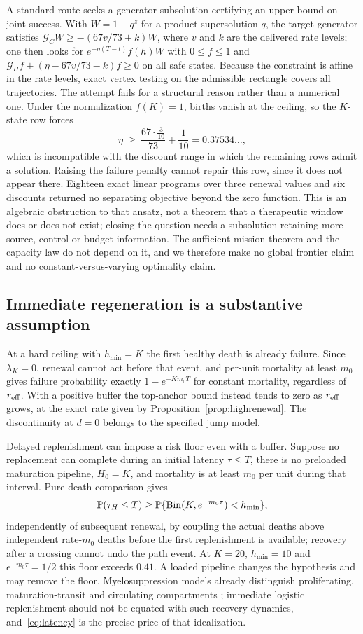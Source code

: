 A standard route seeks a generator subsolution certifying an upper bound on joint success. With $W=1-q^z$ for a product supersolution $q$, the target generator satisfies $\mathcal G_CW\ge-(67v/73+k)W$, where $v$ and $k$ are the delivered rate levels; one then looks for $e^{-\eta(T-t)}f(h)W$ with $0\le f\le1$ and $\mathcal G_Hf+(\eta-67v/73-k)f\ge0$ on all safe states. Because the constraint is affine in the rate levels, exact vertex testing on the admissible rectangle covers all trajectories. The attempt fails for a structural reason rather than a numerical one. Under the normalization $f(K)=1$, births vanish at the ceiling, so the $K$-state row forces
\[
 \eta\ \ge\ \frac{67\cdot\tfrac3{10}}{73}+\frac1{10}=0.37534\ldots,
\]
which is incompatible with the discount range in which the remaining rows admit a solution. Raising the failure penalty cannot repair this row, since it does not appear there. Eighteen exact linear programs over three renewal values and six discounts returned no separating objective beyond the zero function. This is an algebraic obstruction to that ansatz, not a theorem that a therapeutic window does or does not exist; closing the question needs a subsolution retaining more source, control or budget information. The sufficient mission theorem and the capacity law do not depend on it, and we therefore make no global frontier claim and no constant-versus-varying optimality claim.

\subsection{Immediate regeneration is a substantive assumption}
At a hard ceiling with $h_{\min}=K$ the first healthy death is already failure. Since $\lambda_K=0$, renewal cannot act before that event, and per-unit mortality at least $m_0$ gives failure probability exactly $1-e^{-Km_0T}$ for constant mortality, regardless of $r_{\mathrm{eff}}$. With a positive buffer the top-anchor bound instead tends to zero as $r_{\mathrm{eff}}$ grows, at the exact rate given by Proposition~\ref{prop:highrenewal}. The discontinuity at $d=0$ belongs to the specified jump model.

Delayed replenishment can impose a risk floor even with a buffer. Suppose no replacement can complete during an initial latency $\tau\le T$, there is no preloaded maturation pipeline, $H_0=K$, and mortality is at least $m_0$ per unit during that interval. Pure-death comparison gives
\begin{equation}\label{eq:latency}
 \mathbb P(\tau_H\le T)
 \ge\mathbb P\{\operatorname{Bin}(K,e^{-m_0\tau})<h_{\min}\},
\end{equation}
independently of subsequent renewal, by coupling the actual deaths above independent rate-$m_0$ deaths before the first replenishment is available; recovery after a crossing cannot undo the path event. At $K=20$, $h_{\min}=10$ and $e^{-m_0\tau}=1/2$ this floor exceeds $0.41$. A loaded pipeline changes the hypothesis and may remove the floor. Myelosuppression models already distinguish proliferating, maturation-transit and circulating compartments \citep{friberg}; immediate logistic replenishment should not be equated with such recovery dynamics, and~\eqref{eq:latency} is the precise price of that idealization.

